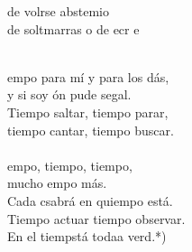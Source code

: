 \begin{cancion}
	de volrse abstemio\\
	de soltmarras o de ecr  e\\\jump\\
	\begin{chorus}%
	empo para mí y para los dás,\\
	y si soy ón pude segal.\\
	Tiempo  saltar, tiempo  parar,\\
	tiempo cantar, tiempo  buscar.\\
\jump\\
	empo, tiempo, tiempo,\\
	mucho empo más.\\
	Cada csabrá en quiempo está.\\
	Tiempo  actuar tiempo  observar.\\
	En el tiempstá todaa verd.*)\\
	\end{chorus}%
	\jump\\
\end{cancion}%
